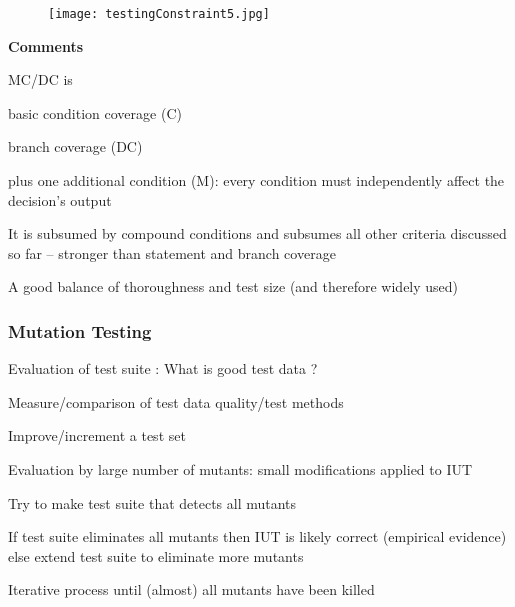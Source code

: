 \begin{figure}[h!]
	\centering
	\texttt{[image: testingConstraint5.jpg]}
	\caption{}
	\label{fig:testingC5}
\end{figure}

\textbf{Comments}
\begin{itemize*}
\item MC/DC is
\begin{itemize*}
\item basic condition coverage (C)
\item branch coverage (DC)
\item plus one additional condition (M): every condition must independently affect the decision's output
\end{itemize*}
\item It is subsumed by compound conditions and subsumes all other criteria discussed so far
– stronger than statement and branch coverage
\item A good balance of thoroughness and test size
(and therefore widely used)
\end{itemize*}

\subsubsection{Mutation Testing}
\begin{itemize*}
\item Evaluation of test suite : What is good test data ?
\item Measure/comparison of test data quality/test methods
\item Improve/increment a test set
\item Evaluation by large number of mutants: small modifications applied to IUT
\item Try to make test suite that detects all mutants
\item If test suite eliminates all mutants then IUT is likely correct (empirical evidence) else extend test suite to eliminate more mutants
\item Iterative process until (almost) all mutants have been killed
\end{itemize*}


